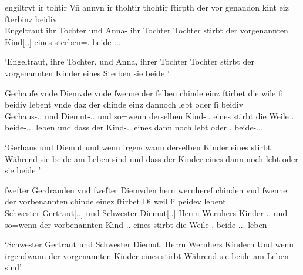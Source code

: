 \begin{exe}
\ex \label{ex:cao_beidiu_neutfem}
	\begin{xlist}
	\ex \label{ex:cao_beidiu_neutfem_1}
		\gll engiltrvt ir tohtir Vn̄ annvn ir thohtir thohtir
			\textelp{} ſtirpth der {vor genandon} kint eiz \textelp{}
			ſterbinz {beidiv \textelp{}} \\
			Engeltraut ihr Tochter und Anna-\Obl{} ihr Tochter Tochter {}
			stirbt der vorgenannten Kind[\Gen.\Pl.\NeutF] eines {}
			sterben=\Tpl\subF.\Nom{} beide-\Nom.\Pl.\NeutF.\St{} \\
		\begin{taggedline}{\parencites(St.~Gallen, 1284)[\pno~629, 57.24--25]{cao2}}
		\trans `Engeltraut, ihre Tochter, und Anna, ihrer Tochter Tochter
			\textelp{} stirbt der vorgenannten Kinder eines \textelp{}
			Sterben sie beide \textelp{}'
		\end{taggedline}

	\ex \label{ex:cao_beidiu_neutfem_2}
		\gll Gerhauſe vnde Diemvde \textelp{} vnde ſwenne {der ſelben}
			chinde einz ſtirbet \textelp{} die wile ſi
			beidiv lebent \textelp{} vnde daz der chinde einz
			dannoch lebt oder ſi beidiv \\
			Gerhaus-\Dat.\Sg.\FemF{} und Diemut-\Dat.\Sg.\FemF{} {} und so=wenn
			derselben Kind-\Gen.\Pl.\NeutF{} eines stirbt {} die Weile
			\Tpl\subF.\Nom{} beide-\Nom.\Pl.\NeutF.\St{} leben {} und dass der
			Kind-\Gen.\Pl.\NeutF{} eines {dann noch} lebt oder \Tpl\subF.\Nom{}
			beide-\Nom.\Pl.\NeutF.\St{} \\
		\begin{taggedline}{\parencites(Nürnberg, 1297)[\pno~2719, 96.43--97.9]{cao4}}
		\trans `Gerhaus  und Diemut \textelp{} und wenn
			irgendwann derselben Kinder eines stirbt \textelp{} Während sie
			beide am Leben sind \textelp{} und dass der Kinder eines dann
			noch lebt oder sie beide \textelp{}'
		\end{taggedline}

	\ex \label{ex:cao_beidiu_neutfem_3}
		\gll ſweſter Gerdrauden vnd ſweſter Diemvden hern wernhereſ
			chinden \textelp{} vnd ſwenne der vorbenannten chinde
			einez ſtirbet \textelp{} Di weil ſi peidev
			lebent \\
			Schwester Gertraut[\Dat.\Sg.\FemF] und Schwester
			Diemut[\Dat.\Sg.\FemF] Herrn Wernhers Kinder-\Dat.\Pl.\NeutF{} {}
			und so=wenn der vorbenannten Kind-\Gen.\Pl.\NeutF{} eines stirbt
			{} die Weile \Tpl\subF.\Nom{} beide-\Nom.\Pl.\NeutF.\St{} leben \\
		\begin{taggedline}{\parencites(Engelthal, Kr.~Nürnberger Land, 1298)[\pno~2960, 240.31--38]{cao4}}
		\trans `Schwester Gertraut und Schwester Diemut, Herrn Wernhers
			Kindern \textelp{} Und wenn irgendwann der vorgenannten Kinder eines
			stirbt \textelp{} Während sie beide am Leben sind'
		\end{taggedline}
	\end{xlist}
\end{exe}

